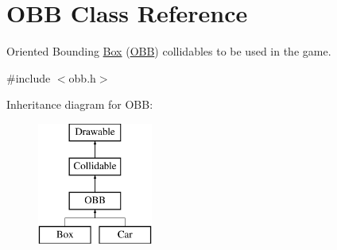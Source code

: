 \hypertarget{class_o_b_b}{}\section{O\+B\+B Class Reference}
\label{class_o_b_b}


Oriented Bounding \hyperlink{class_box}{Box} (\hyperlink{class_o_b_b}{O\+B\+B}) collidables to be used in the game.  




{\ttfamily \#include $<$obb.\+h$>$}

Inheritance diagram for O\+B\+B\+:\begin{figure}[H]
\begin{center}
\leavevmode
\includegraphics[height=4.000000cm]{class_o_b_b}
\end{center}
\end{figure}
